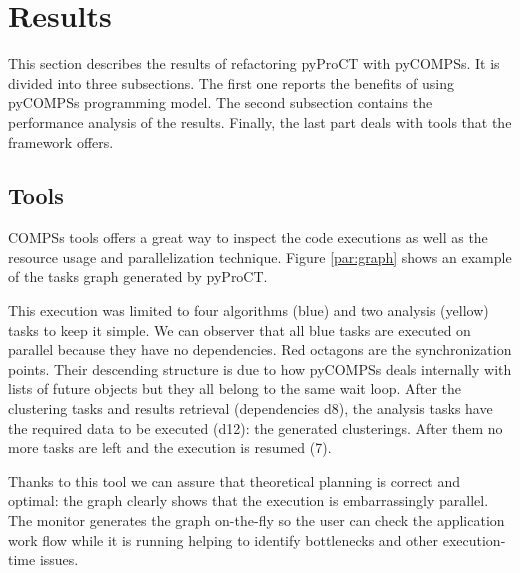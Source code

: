 \chapter{Results}


This section describes the results of refactoring pyProCT with pyCOMPSs. It is divided into three subsections. The first one reports the benefits of using pyCOMPSs programming model. The second subsection contains the performance analysis of the results. Finally, the last part deals with tools that the framework offers.

\section{Tools}

COMPSs tools offers a great way to inspect the code executions as well as the resource usage and parallelization technique. Figure \ref{par:graph} shows an example of the tasks graph generated by pyProCT. 

This execution was limited to four algorithms (blue) and two analysis (yellow) tasks to keep it simple. We can observer that all blue tasks are executed on parallel because they have no dependencies. Red octagons are the synchronization points. Their descending structure is due to how pyCOMPSs deals internally with lists of future objects but they all belong to the same wait loop. After the clustering tasks and results retrieval (dependencies d8), the analysis tasks have the required data to be executed (d12): the generated clusterings. After them no more tasks are left and the execution is resumed (7).

Thanks to this tool we can assure that theoretical planning is correct and optimal: the graph clearly shows that the execution is embarrassingly parallel. The monitor generates the graph on-the-fly so the user can check the application work flow while it is running helping to identify bottlenecks and other execution-time issues.

